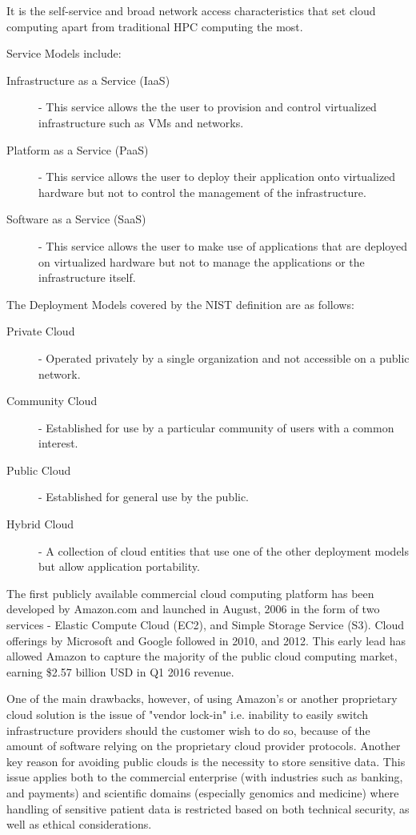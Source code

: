 It is the self-service and broad network access characteristics that set cloud computing apart from traditional HPC computing the most.

Service Models include:

\begin{description}
\item [Infrastructure as a Service (IaaS)] - This service allows the the user to provision and control virtualized infrastructure such as VMs and networks.
\item [Platform as a Service (PaaS)] - This service allows the user to deploy their application onto virtualized hardware but not to control the management of the infrastructure.
\item [Software as a Service (SaaS)] - This service allows the user to make use of applications that are deployed on virtualized hardware but not to manage the applications or the infrastructure itself.
\end{description}

The Deployment Models covered by the NIST definition are as follows:

\begin{description}
\item [Private Cloud] - Operated privately by a single organization and not accessible on a public network.
\item [Community Cloud] - Established for use by a particular community of users with a common interest.
\item [Public Cloud] - Established for general use by the public.
\item [Hybrid Cloud] - A collection of cloud entities that use one of the other deployment models but allow application portability.
\end{description}

The first publicly available commercial cloud computing platform has been developed by Amazon.com and launched in August, 2006 in the form of two services - Elastic Compute Cloud (EC2), and Simple Storage Service (S3). Cloud offerings by Microsoft and Google followed in 2010, and 2012. This early lead has allowed Amazon to capture the majority of the public cloud computing market, earning \$2.57 billion USD in Q1 2016 revenue.

One of the main drawbacks, however, of using Amazon's or another proprietary cloud solution is the issue of "vendor lock-in" i.e. inability to easily switch infrastructure providers should the customer wish to do so, because of the amount of software relying on the proprietary cloud provider protocols. Another key reason for avoiding public clouds is the necessity to store sensitive data. This issue applies both to the commercial enterprise (with industries such as banking, and payments) and scientific domains (especially genomics and medicine) where handling of sensitive patient data is restricted based on both technical security, as well as ethical considerations\autocite{knoppers2005human}.

